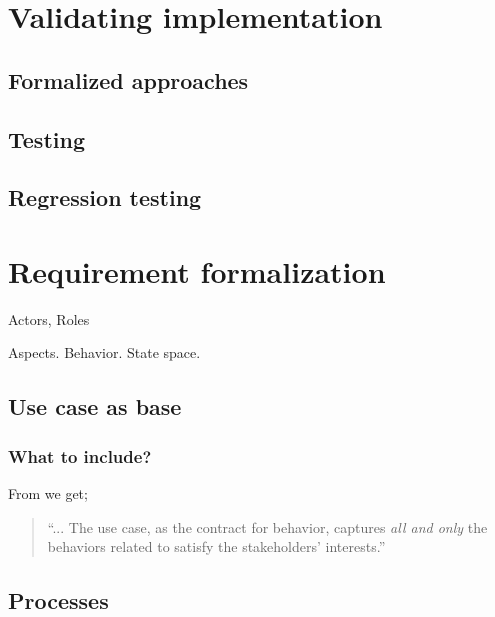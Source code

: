 \documentclass[10pt]{scrreprt}
\begin{document}

\chapter{Validating implementation}

\section{Formalized approaches}
\section{Testing}

\section{Regression testing}

\chapter{Requirement formalization}
Actors, Roles

Aspects. Behavior. State space.

\section{Use case as base}

\subsection{What to include?}
From \cite{Cockburn:2000:WEU:517669} we get;
\begin{quote}
``... The use case, as the contract for behavior, captures \emph{all and only} the behaviors related to satisfy the stakeholders’ interests.''
\end{quote}

\section{Processes}
\end{document}
